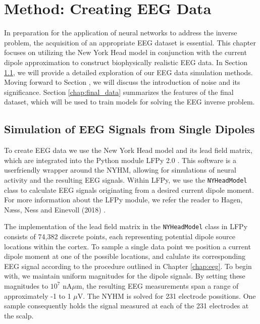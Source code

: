 \documentclass[a4paper, UKenglish, 11pt]{uiomaster}
\begin{document}
\chapter{Method: Creating EEG Data} \label{chap:eeg_data}
In preparation for the application of neural networks to address the inverse problem, the acquisition of an appropriate EEG dataset is essential. This chapter focuses on utilizing the New York Head model in conjunction with the current dipole approximation to construct biophysically realistic EEG data.
In Section \ref{chap:simulation}, we will provide a detailed exploration of our EEG data simulation methods. Moving forward to Section \label{chap:noise}, we will discuss the introduction of noise and its significance. Section \ref{chap:final_data} summarizes the features of the final dataset, which will be used to train models for solving the EEG inverse problem.


\section{Simulation of EEG Signals from Single Dipoles} \label{chap:simulation}
To create EEG data we use the New York Head model and its lead field matrix, which are integrated into the Python module LFPy 2.0 \cite{LFPy}. This software is a userfriendly wrapper around the NYHM, allowing for simulations of neural activity and the resulting EEG signals. Within LFPy, we use the \texttt{NYHeadModel} class to calculate EEG signals originating from a desired current dipole moment. For more information about the LFPy module, we refer the reader to Hagen, Næss, Ness and Einevoll (2018) \cite{LFPy}.

The implementation of the lead field matrix in the \texttt{NYHeadModel} class in LFPy consists of 74,382 discrete points, each representing potential dipole source locations within the cortex. To sample a single data point we position a current dipole moment at one of the possible locations, and calulate its corresponding EEG signal according to the procedure outlined in Chapter \ref{chap:eeg}. To begin with, we maintain uniform magnitudes for the dipole signals. By setting these magnitudes to $10^7$ nA$\mu$m, the resulting EEG measurements span a range of approximately -1 to 1 $\mu$V. The NYHM is solved for 231 electrode possitions. One sample consequently holds the signal measured at each of the 231 electrodes at the scalp.
\end{document}
